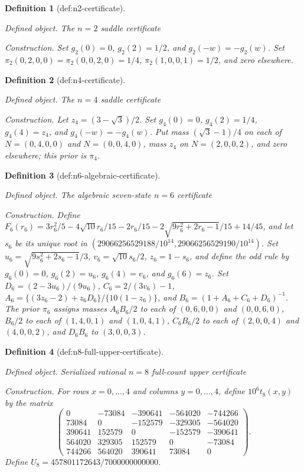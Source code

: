 \documentclass{article}
\newtheorem{definition}{Definition}
\begin{document}
\begin{definition}[def:n2-certificate]\label{def:n2-certificate}
\par\smallskip\noindent\emph{Defined object.} The \(n=2\) saddle certificate
\par\smallskip\noindent\emph{Construction.} Set \(g_2(0)=0\), \(g_2(2)=1/2\), and \(g_2(-w)=-g_2(w)\). Set \(\pi_2(0,2,0,0)=\pi_2(0,0,2,0)=1/4\), \(\pi_2(1,0,0,1)=1/2\), and zero elsewhere.
\end{definition}

\begin{definition}[def:n4-certificate]\label{def:n4-certificate}
\par\smallskip\noindent\emph{Defined object.} The \(n=4\) saddle certificate
\par\smallskip\noindent\emph{Construction.} Let \(z_4=(3-\sqrt3)/2\). Set \(g_4(0)=0\), \(g_4(2)=1/4\), \(g_4(4)=z_4\), and \(g_4(-w)=-g_4(w)\). Put mass \((\sqrt3-1)/4\) on each of \(N=(0,4,0,0)\) and \(N=(0,0,4,0)\), mass \(z_4\) on \(N=(2,0,0,2)\), and zero elsewhere; this prior is \(\pi_4\).
\end{definition}

\begin{definition}[def:n6-algebraic-certificate]\label{def:n6-algebraic-certificate}
\par\smallskip\noindent\emph{Defined object.} The algebraic seven-state \(n=6\) certificate
\par\smallskip\noindent\emph{Construction.} Define \(F_6(r_6)=3r_6^2/5-4\sqrt{10}r_6/15-2r_6/15-2\sqrt{9r_6^2+2r_6-1}/15+14/45\), and let \(s_6\) be its unique root in \((29066256529188/10^{14},29066256529190/10^{14})\). Set \(u_6=\sqrt{9s_6^2+2s_6-1}/3\), \(v_6=\sqrt{10}s_6/2\), \(z_6=1-s_6\), and define the odd rule by \(g_6(0)=0\), \(g_6(2)=u_6\), \(g_6(4)=v_6\), and \(g_6(6)=z_6\). Set \(D_6=(2-3u_6)/(9u_6)\), \(C_6=2/(3v_6)-1\), \(A_6=\{(3z_6-2)+z_6D_6\}/\{10(1-z_6)\}\), and \(B_6=(1+A_6+C_6+D_6)^{-1}\). The prior \(\pi_6\) assigns masses \(A_6B_6/2\) to each of \((0,6,0,0)\) and \((0,0,6,0)\), \(B_6/2\) to each of \((1,4,0,1)\) and \((1,0,4,1)\), \(C_6B_6/2\) to each of \((2,0,0,4)\) and \((4,0,0,2)\), and \(D_6B_6\) to \((3,0,0,3)\).
\end{definition}

\begin{definition}[def:n8-full-upper-certificate]\label{def:n8-full-upper-certificate}
\par\smallskip\noindent\emph{Defined object.} Serialized rational \(n=8\) full-count upper certificate
\par\smallskip\noindent\emph{Construction.} For rows \(x=0,\ldots,4\) and columns \(y=0,\ldots,4\), define \(10^6t_8(x,y)\) by the matrix \[\begin{pmatrix}0&-73084&-390641&-564020&-744266\\73084&0&-152579&-329305&-564020\\390641&152579&0&-152579&-390641\\564020&329305&152579&0&-73084\\744266&564020&390641&73084&0\end{pmatrix}.\] Define \(U_8=457801172643/7000000000000\).
\end{definition}
\end{document}

